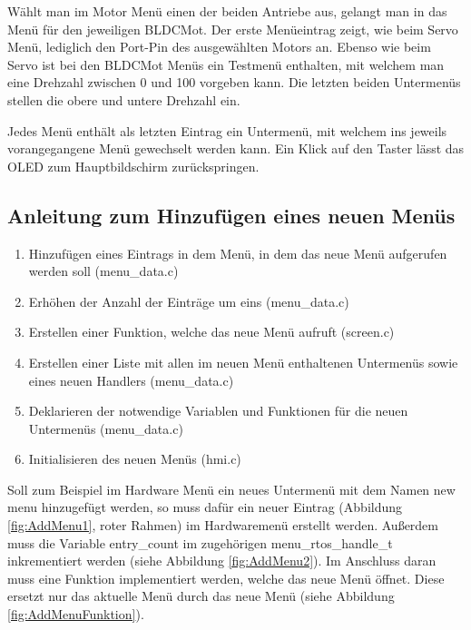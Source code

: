 Wählt man im Motor Menü einen der beiden Antriebe aus, gelangt man in das Menü für den jeweiligen \ac{BLDCMot}. Der erste Menüeintrag zeigt, wie beim Servo Menü, lediglich den Port-Pin des ausgewählten Motors an. Ebenso wie beim Servo ist bei den \ac{BLDCMot} Menüs ein Testmenü enthalten, mit welchem man eine Drehzahl zwischen 0 und 100 vorgeben kann. Die letzten beiden Untermenüs stellen die obere und untere Drehzahl ein.\vspace{11pt}

Jedes Menü enthält als letzten Eintrag ein Untermenü, mit welchem ins jeweils vorangegangene Menü gewechselt werden kann. Ein Klick auf den Taster lässt das \ac{OLED} zum Hauptbildschirm zurückspringen.

\subsection{Anleitung zum Hinzufügen eines neuen Menüs}\label{sec:MenüHinzufügen}

\begin{enumerate}
\item Hinzufügen eines Eintrags in dem Menü, in dem das neue Menü aufgerufen werden soll (\glqq menu\_data.c\grqq)
\item Erhöhen der Anzahl der Einträge um eins (\glqq menu\_data.c\grqq)
\item Erstellen einer Funktion, welche das neue Menü aufruft (\glqq screen.c\grqq{})
\item Erstellen einer Liste mit allen im neuen Menü enthaltenen Untermenüs sowie eines neuen Handlers (\glqq menu\_data.c\grqq)
\item Deklarieren der notwendige Variablen und Funktionen für die neuen Untermenüs (\glqq menu\_data.c\grqq)
\item Initialisieren des neuen Menüs (\glqq hmi.c\grqq)
\end{enumerate}

Soll zum Beispiel im Hardware Menü ein neues Untermenü mit dem Namen \glqq new menu\grqq{} hinzugefügt werden, so muss dafür ein neuer Eintrag (Abbildung \ref{fig:AddMenu1}, roter Rahmen) im Hardwaremenü erstellt werden. Außerdem muss die Variable \glqq entry\_count\grqq{} im zugehörigen \glqq menu\_rtos\_handle\_t\grqq{} inkrementiert werden (siehe Abbildung \ref{fig:AddMenu2}). Im Anschluss daran muss eine Funktion implementiert werden, welche das neue Menü öffnet. Diese ersetzt nur das aktuelle Menü durch das neue Menü (siehe Abbildung \ref{fig:AddMenuFunktion}).

